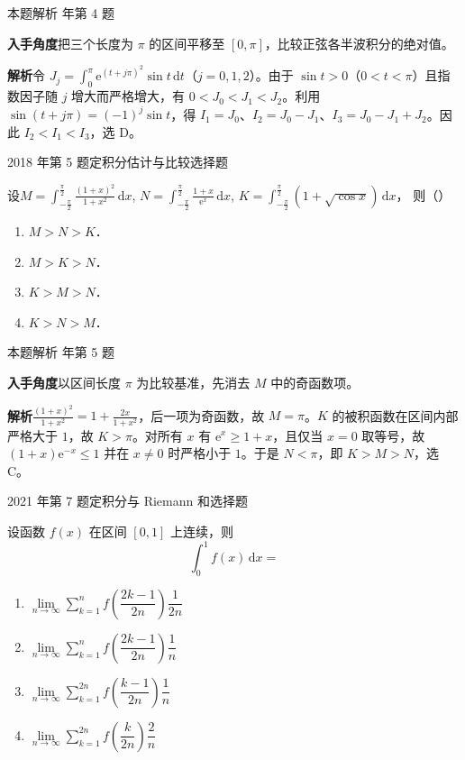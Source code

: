 \documentclass[UTF8,zihao=-4,fontset=fandol]{ctexart}
\renewcommand{\lim}{\operatorname*{lim}\limits}
\newcommand{\pickout}{\hfill（\hspace{1.4em}）}
\newenvironment{abcd}{\begin{enumerate}[label=\textup{(\Alph*)},leftmargin=2.3em,itemsep=1pt,topsep=4pt,parsep=1pt]}{\end{enumerate}}
\newcommand{\choices}[4]{%
  \begin{abcd}
    \item #1
    \item #2
    \item #3
    \item #4
  \end{abcd}}
\newcommand{\QuestionPage}[6]{%
  \par\noindent\begin{minipage}{\linewidth}
  \raggedright
  {\small\textcolor{black!60}{#3\quad #5}\hfill\textcolor{accent}{#2}}\par\smallskip}
\newcommand{\QuestionEnd}{\end{minipage}\par\medskip}
\newcommand{\QuestionPage}[6]{%
  \clearpage
  {\small\textcolor{accent}{#1\hfill #2}}\par\medskip
  {\small\textcolor{black!60}{#3\quad #5\hfill #6}}\par\vspace{9bp}}
\newcommand{\QuestionEnd}{}
\newenvironment{QuestionSolution}[1]{%
  \clearpage
  {\small\textcolor{black!60}{本题解析\quad #1}}\par\medskip
}{\par\clearpage}
\begin{document}
\begin{QuestionSolution}{2012 年第 4 题}
\textbf{入手角度}\quad 把三个长度为 \(\pi\) 的区间平移至 \([0,\pi]\)，比较正弦各半波积分的绝对值。

\textbf{解析}\quad 令 \(J_j=\int_0^\pi \mathrm{e}^{(t+j\pi)^2}\sin t\,\mathrm{d}t\)（\(j=0,1,2\)）。由于 \(\sin t>0\)（\(0<t<\pi\)）且指数因子随 \(j\) 增大而严格增大，有 \(0<J_0<J_1<J_2\)。利用 \(\sin(t+j\pi)=(-1)^j\sin t\)，得 \(I_1=J_0\)、\(I_2=J_0-J_1\)、\(I_3=J_0-J_1+J_2\)。因此 \(I_2<I_1<I_3\)，选 D。
\end{QuestionSolution}

\QuestionPage{3.1 定积分的概念、存在条件与性质}{选择题}{2018 年第 5 题}{1}{定积分估计与比较}{131 / 234}
设$M = \int_{-\frac{\pi}{2}}^{\frac{\pi}{2}} \frac{\left(1 + x \right)^2}{1 + x^2}\,\mathrm{d} x$,
  $N = \int_{-\frac{\pi}{2}}^{\frac{\pi}{2}} \frac{1 + x}{\mathrm{e}^x}\,\mathrm{d} x$,
  $K = \int_{-\frac{\pi}{2}}^{\frac{\pi}{2}} \left(1 + \sqrt{\cos x}\right)\,\mathrm{d} x$，
则\pickout{}
\begin{abcd}
\item $M > N > K$．
\item $M > K > N$．
\item $K > M > N$．
\item $K > N > M$．
\end{abcd}
\QuestionEnd

\begin{QuestionSolution}{2018 年第 5 题}
\textbf{入手角度}\quad 以区间长度 \(\pi\) 为比较基准，先消去 \(M\) 中的奇函数项。

\textbf{解析}\quad \(\frac{(1+x)^2}{1+x^2}=1+\frac{2x}{1+x^2}\)，后一项为奇函数，故 \(M=\pi\)。\(K\) 的被积函数在区间内部严格大于 \(1\)，故 \(K>\pi\)。对所有 \(x\) 有 \(\mathrm{e}^x\ge1+x\)，且仅当 \(x=0\) 取等号，故 \((1+x)\mathrm{e}^{-x}\le1\) 并在 \(x\ne0\) 时严格小于 \(1\)。于是 \(N<\pi\)，即 \(K>M>N\)，选 C。
\end{QuestionSolution}

\QuestionPage{3.1 定积分的概念、存在条件与性质}{选择题}{2021 年第 7 题}{1}{定积分与 Riemann 和}{132 / 234}
设函数 \(f(x)\) 在区间 \(\left[0,1\right]\) 上连续，则
\[\int_{0}^{1} f(x)\,\mathrm{d}x=
\]
\choices{\(\lim_{n \to \infty}\sum_{k=1}^{n} f\left(\dfrac{2k-1}{2n}\right)\dfrac{1}{2n}\)}{\(\lim_{n \to \infty}\sum_{k=1}^{n} f\left(\dfrac{2k-1}{2n}\right)\dfrac{1}{n}\)}{\(\lim_{n \to \infty}\sum_{k=1}^{2n} f\left(\dfrac{k-1}{2n}\right)\dfrac{1}{n}\)}{\(\lim_{n \to \infty}\sum_{k=1}^{2n} f\left(\dfrac{k}{2n}\right)\dfrac{2}{n}\)}
\QuestionEnd
\end{document}
